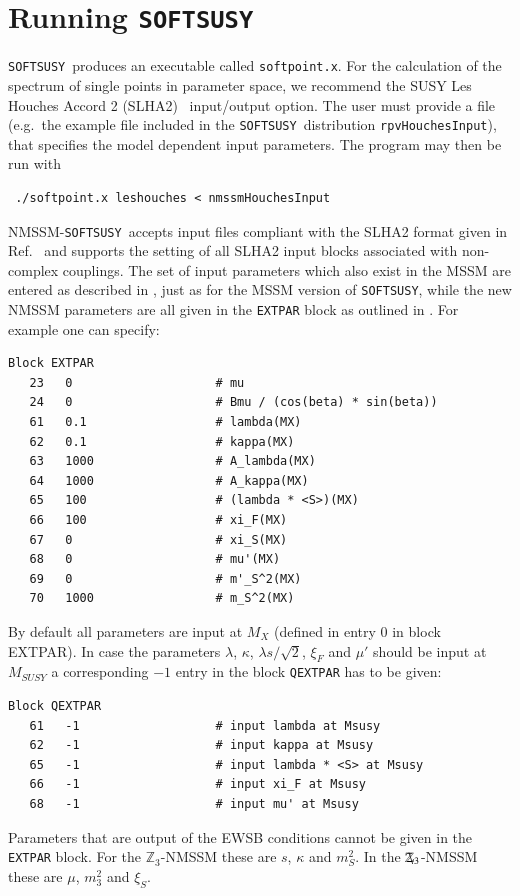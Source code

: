\documentclass[final,3p,times]{elsarticle}
\def\SOFTSUSY{{\tt SOFTSUSY}}
\def\code#1{\small{\tt #1}\normalsize}
\newcommand{\Zv}{\,\mathbf{\backslash}\mkern-11.0mu{\mathbb{Z}}_{3}} %
\begin{document}
\appendix

\section{Running \SOFTSUSY}
\label{sec:run}

\SOFTSUSY~produces an executable called \code{softpoint.x}. For the calculation
of the spectrum of single points in parameter space, we recommend the
SUSY Les Houches Accord 2 (SLHA2)~\cite{Allanach:2008qq}  input/output
option. The user must provide a file (e.g.\ the example file included
in the \SOFTSUSY~distribution
\code{rpvHouchesInput}), that specifies the model dependent input
parameters. The program may then be run with
\small
\begin{verbatim}
 ./softpoint.x leshouches < nmssmHouchesInput
\end{verbatim}
\normalsize

NMSSM-\SOFTSUSY\ accepts input files compliant with the SLHA2 format given in Ref.~\cite{Allanach:2008qq} and supports the setting of all SLHA2
input blocks associated with non-complex couplings.  The set of input
parameters which also exist in the MSSM are entered as described in
\cite{Skands:2003cj}, just as for the MSSM version of \SOFTSUSY, while
the new NMSSM parameters are all given in the \code{EXTPAR} block as
outlined in \cite{Allanach:2008qq}.  For example one can specify:
%
\begin{verbatim}
Block EXTPAR
   23   0                    # mu
   24   0                    # Bmu / (cos(beta) * sin(beta))
   61   0.1                  # lambda(MX)
   62   0.1                  # kappa(MX)
   63   1000                 # A_lambda(MX)
   64   1000                 # A_kappa(MX)
   65   100                  # (lambda * <S>)(MX)
   66   100                  # xi_F(MX)
   67   0                    # xi_S(MX)
   68   0                    # mu'(MX)
   69   0                    # m'_S^2(MX)
   70   1000                 # m_S^2(MX)
\end{verbatim}
%
By default all parameters are input at $M_X$ (defined in entry 0 in
block EXTPAR).  In case the parameters $\lambda$, $\kappa$, $\lambda
s / \sqrt{2}$, $\xi_F$ and $\mu'$ should be input at $M_{SUSY}$ a corresponding
$-1$ entry in the block \code{QEXTPAR} has to be given:
%
\begin{verbatim}
Block QEXTPAR
   61   -1                   # input lambda at Msusy
   62   -1                   # input kappa at Msusy
   65   -1                   # input lambda * <S> at Msusy
   66   -1                   # input xi_F at Msusy
   68   -1                   # input mu' at Msusy
\end{verbatim}
%
Parameters that are output of the EWSB conditions cannot be given in
the \code{EXTPAR} block.  For the $\mathbb{Z}_3$-NMSSM these are $s$,
$\kappa$ and $m_S^2$.  In the $\Zv$-NMSSM these are $\mu$, $m_3^2$ and
$\xi_S$.
\end{document}
